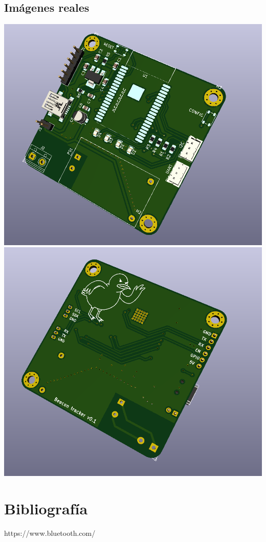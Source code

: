 \documentclass[a4paper ,12pt, onecolumn]{article}
\begin{document}
    \subsection{Imágenes reales}
        \includegraphics[scale=0.4]{../receiver_1.PNG}
        \includegraphics[scale=0.4]{../receiver_2.PNG}

\section{Bibliografía}
https://www.bluetooth.com/
\end{document}
